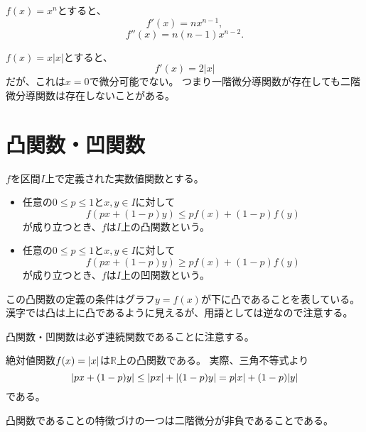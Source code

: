 \begin{example}
$f(x) = x^n$とすると、
$$
f'(x) = n x^{n-1},
$$
$$
f''(x) = n(n-1) x^{n-2}.
$$
\end{example}

\begin{example}
$f(x) = x|x|$とすると、
$$
f'(x) = 2|x|
$$
だが、これは$x = 0$で微分可能でない。
つまり一階微分導関数が存在しても二階微分導関数は存在しないことがある。
\end{example}

\section{凸関数・凹関数}

\begin{definition}
$f$を区間$I$上で定義された実数値関数とする。
\begin{itemize}
\item
任意の$0 \le p \le 1$と$x, y \in I$に対して
\begin{equation}
\label{e_convex}
f(p x+(1-p)y) \le p f(x)+(1-p)f(y)
\end{equation}
が成り立つとき、$f$は$I$上の凸関数という。
\item
任意の$0 \le p \le 1$と$x, y \in I$に対して
$$
f(p x+(1-p)y) \ge p f(x)+(1-p)f(y)
$$
が成り立つとき、$f$は$I$上の凹関数という。
\end{itemize}
\end{definition}

この凸関数の定義の条件はグラフ$y = f(x)$が下に凸であることを表している。
漢字では凸は上に凸であるように見えるが、用語としては逆なので注意する。

凸関数・凹関数は必ず連続関数であることに注意する。

\begin{example}
絶対値関数$f(x) = \abs{x}$は$\mathbb{R}$上の凸関数である。
実際、三角不等式より
$$
\abs{p x+(1-p)y} \le \abs{p x}+\abs{(1-p)y} = p\abs{x}+(1-p)\abs{y}
$$
である。
\end{example}

凸関数であることの特徴づけの一つは二階微分が非負であることである。

